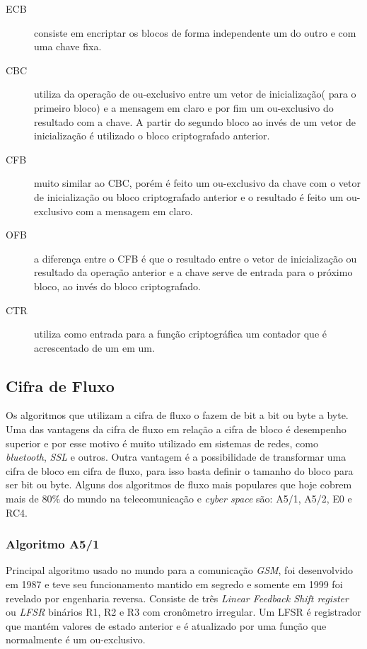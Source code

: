 \begin{description}
\item [ECB]consiste em encriptar os blocos de forma independente um do outro e com uma chave fixa.
\item[CBC] utiliza da operação de ou-exclusivo entre um vetor de inicialização( para o primeiro bloco) e a mensagem em claro e por fim um ou-exclusivo do resultado com a chave. A partir do segundo bloco ao invés de um vetor de inicialização é utilizado o bloco criptografado anterior.
\item[CFB] muito similar ao CBC, porém é feito um ou-exclusivo da chave com o vetor de inicialização ou bloco criptografado anterior e o resultado é feito um ou-exclusivo com a mensagem em claro.
\item[OFB] a diferença entre o CFB é que o resultado entre o vetor de inicialização ou resultado da operação anterior e a chave serve de entrada para o próximo bloco, ao invés do bloco criptografado.
\item[CTR] utiliza como entrada para a função criptográfica um contador que é acrescentado de um em um. 
\end{description}

\subsection{Cifra de Fluxo}
\label{stream-cipher}

Os algoritmos que utilizam a cifra de fluxo o fazem de bit a bit ou byte a byte. Uma das vantagens da cifra de fluxo em relação a cifra de bloco é desempenho superior e por esse motivo é muito utilizado em sistemas de redes, como \textit{bluetooth}, \textit{SSL} e outros. Outra vantagem é a possibilidade de transformar uma cifra de bloco em cifra de fluxo, para isso basta definir o tamanho do bloco para ser bit ou byte. Alguns dos algoritmos de fluxo mais populares que hoje cobrem mais de 80$\%$ do mundo na telecomunicação e \textit{cyber space} são: A5/1, A5/2, E0 e RC4. ~\cite{pegar-citação}


\subsubsection{Algoritmo A5/1}
\label{algorithm-a51}

Principal algoritmo usado no mundo para a comunicação \textit{GSM}, foi desenvolvido em 1987 e teve seu funcionamento mantido em segredo e somente em 1999 foi revelado por engenharia reversa. Consiste de três \textit{Linear Feedback Shift register} ou \textit{LFSR} binários R1, R2 e R3 com cronômetro irregular. Um LFSR é registrador que mantém valores de estado anterior e é atualizado por uma função que normalmente é um ou-exclusivo. 

